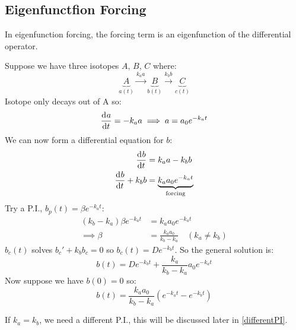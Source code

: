 \documentclass[../main.tex]{subfiles}
\begin{document}
\subsection{Eigenfunctfion Forcing}
In eigenfunction forcing, the forcing term is an eigenfunction of the differential operator.
\begin{example}
  Suppose we have three isotopes $A$, $B$, $C$ where:
  \[
    \underbrace{A}_{a(t)} \xrightarrow{k_a a} \underbrace{B}_{b(t)} \xrightarrow{k_b b} \underbrace{C}_{c(t)}
  \]
  Isotope only decays out of A so:
  \[
    \deriv{a}{t} = -k_a a \implies a = a_0 e^{-k_a t}
  \]
  We can now form a differential equation for $b$:
  \begin{align*}
    \deriv{b}{t} &= k_a a -k_b b \\
    \deriv{b}{t} + k_b b &= \underbrace{k_a a_0 e^{-k_a t}}_{\text{forcing}} \\
    \label{radioactive}
  \end{align*}
  Try a P.I., $b_p(t) = \beta e^{-k_a t}$:
  \begin{align*}
    (k_b - k_a)\beta e^{-k_a t} &= k_a a_0e^{-k_a t} \\
    \implies \beta &= \frac{k_a a_0}{k_b - k_a}\quad(k_a \neq k_b)
  \end{align*}
  $b_c(t)$ solves $b_c' + k_b b_c = 0$ so $b_c(t) = De^{-k_b t}$.
  So the general solution is:
  \[
    b(t) = De^{-k_b t} + \frac{k_a}{k_b - k_a}a_0 e^{-k_a t}
  \]
  Now suppose we have $b(0) = 0$ so:
  \[
    b(t) = \frac{k_a a_0}{k_b - k_a}(e^{-k_a t} - e^{-k_b t})
  \]
  \begin{center}
  \end{center}
  If $k_a = k_b$, we need a different P.I., this will be discussed later in \cref{differentPI}.
\end{example}
\end{document}
